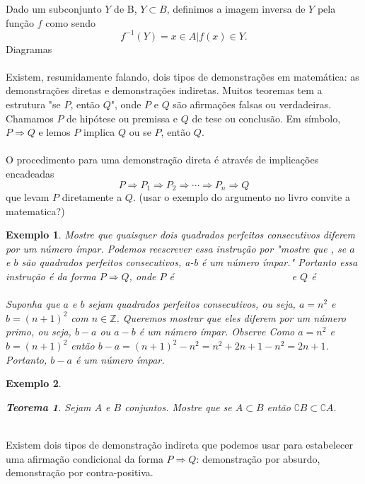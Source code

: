 \documentclass[10pt]{article}
\newtheorem{teo}{Teorema}
\newtheorem{exemplo}{Exemplo}
\begin{document}
Dado um subconjunto $Y$ de B, $Y\subset B$, definimos a imagem inversa de $Y$ pela função $f$ como sendo $$f^{-1}(Y)={x\in A|f(x)\in Y}.$$
Diagramas\\[2pc]
\\
Existem, resumidamente falando, dois tipos de demonstrações em matemática: as demonstrações diretas e demonstrações indiretas. Muitos teoremas tem a estrutura "se $P$, então $Q$", onde $P$ e $Q$ são afirmações falsas ou verdadeiras. Chamamos $P$ de hipótese ou premissa e $Q$ de tese ou conclusão. Em símbolo, $P\Rightarrow Q$ e lemos $P$ implica $Q$ ou se $P$, então $Q$.\\
\\
O procedimento para uma demonstração direta é através de implicações encadeadas $$P\Rightarrow P_1\Rightarrow P_2\Rightarrow \cdots \Rightarrow P_n\Rightarrow Q$$ que levam $P$ diretamente a $Q$. (usar o exemplo do argumento no livro convite a matematica?)
\begin{exemplo}
Mostre que quaisquer dois quadrados perfeitos consecutivos diferem por um número ímpar. Podemos reescrever essa instrução por "mostre que , se $a$ e $b$ são quadrados perfeitos consecutivos, a-b é um número ímpar." Portanto essa instrução é da forma $P\Rightarrow Q$, onde $P$  é \, \, \, \, \, \, \, \, \, \, \, \, \, \, \, \, \, \,  \, \, \, \,      e $Q$ é  \, \, \, \,  \, \, \, \,  \, \, \, \,  \, \, \, \, \\
Suponha que $a$ e $b$ sejam quadrados perfeitos consecutivos, ou seja, $a=n^2$ e $b=(n+1)^2$ com $n\in \mathbb{Z}$. Queremos mostrar que eles diferem por um número primo, ou seja, $b-a$ ou $a-b$ é um número ímpar. Observe
Como $a=n^2$ e $b=(n+1)^2$ então $b-a=(n+1)^2-n^2=n^2+2n+1-n^2=2n+1$. Portanto, $b-a$ é um número ímpar.
\end{exemplo}
\begin{exemplo}
\begin{teo}Sejam $A$ e $B$ conjuntos. Mostre que se $A\subset B$ então $\complement B \subset \complement A$.\end{teo}
\vspace{2cm}
\end{exemplo}
\\
Existem dois tipos de demonstração indireta que podemos usar para estabelecer uma afirmação condicional da forma $P\Rightarrow Q$: demonstração por absurdo, demonstração por contra-positiva.\\
\end{document}
